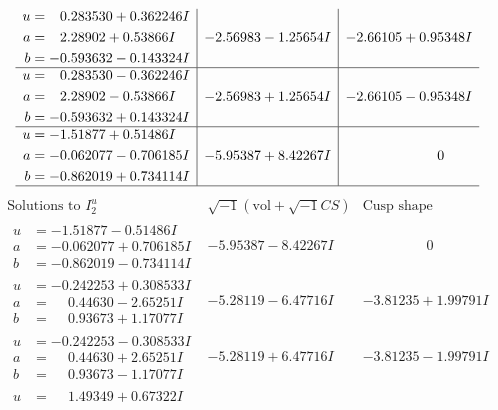 \documentclass[1p]{elsarticle_modified}
\theoremstyle{definition}
\newcommand{\I}{\sqrt{-1}}
\begin{document}
$$\begin{array}{c|c|c}
\begin{aligned}
u &= \phantom{-}0.283530 + 0.362246 I \\
a &= \phantom{-}2.28902 + 0.53866 I \\
b &= -0.593632 - 0.143324 I\end{aligned}
 & -2.56983 - 1.25654 I & -2.66105 + 0.95348 I \\ \hline\begin{aligned}
u &= \phantom{-}0.283530 - 0.362246 I \\
a &= \phantom{-}2.28902 - 0.53866 I \\
b &= -0.593632 + 0.143324 I\end{aligned}
 & -2.56983 + 1.25654 I & -2.66105 - 0.95348 I \\ \hline\begin{aligned}
u &= -1.51877 + 0.51486 I \\
a &= -0.062077 - 0.706185 I \\
b &= -0.862019 + 0.734114 I\end{aligned}
 & -5.95387 + 8.42267 I & \phantom{-0.000000 } 0\\
 \hline 
 \end{array}$$\newpage$$\begin{array}{c|c|c}  
\text{Solutions to }I^u_{2}& \I (\text{vol} + \sqrt{-1}CS) & \text{Cusp shape}\\
 \hline 
\begin{aligned}
u &= -1.51877 - 0.51486 I \\
a &= -0.062077 + 0.706185 I \\
b &= -0.862019 - 0.734114 I\end{aligned}
 & -5.95387 - 8.42267 I & \phantom{-0.000000 } 0 \\ \hline\begin{aligned}
u &= -0.242253 + 0.308533 I \\
a &= \phantom{-}0.44630 - 2.65251 I \\
b &= \phantom{-}0.93673 + 1.17077 I\end{aligned}
 & -5.28119 - 6.47716 I & -3.81235 + 1.99791 I \\ \hline\begin{aligned}
u &= -0.242253 - 0.308533 I \\
a &= \phantom{-}0.44630 + 2.65251 I \\
b &= \phantom{-}0.93673 - 1.17077 I\end{aligned}
 & -5.28119 + 6.47716 I & -3.81235 - 1.99791 I \\ \hline\begin{aligned}
u &= \phantom{-}1.49349 + 0.67322 I \\

\end{aligned}
\end{array}$$
\end{document}
